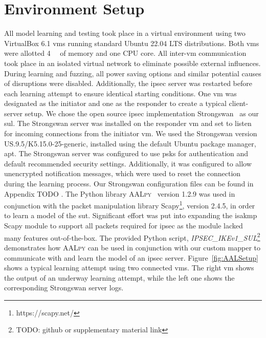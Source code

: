 \section{Environment Setup} \label{sec:env}
All model learning and testing took place in a virtual environment using two VirtualBox 6.1 \acp{vm} running standard Ubuntu 22.04 LTS distributions. Both \acp{vm} were allotted \SI{4}{\giga\byte} of memory and one CPU core. All inter-\ac{vm} communication took place in an isolated virtual network to eliminate possible external influences. During learning and fuzzing, all power saving options and similar potential causes of disruptions were disabled. Additionally, the \ac{ipsec} server was restarted before each learning attempt to ensure identical starting conditions. One \ac{vm} was designated as the initiator and one as the responder to create a typical client-server setup. We chose the open source \ac{ipsec} implementation Strongswan~\cite{software:strongswan} as our \ac{sul}. The Strongswan server was installed on the responder \ac{vm} and set to listen for incoming connections from the initiator \ac{vm}. We used the Strongswan version US.9.5/K5.15.0-25-generic, installed using the default Ubuntu package manager, apt. The Strongswan server was configured to use \acp{psk} for authentication and default recommended security settings. Additionally, it was configured to allow unencrypted notification messages, which were used to reset the connection during the learning process. Our Strongswan configuration files can be found in Appendix TODO . The Python library \textsc{AALpy}~\cite{software:aalpy} version 1.2.9 was used in conjunction with the packet manipulation library Scapy\footnote{https://scapy.net/}, version 2.4.5, in order to learn a model of the \ac{sut}. Significant effort was put into expanding the \ac{isakmp} Scapy module to support all packets required for \ac{ipsec} as the module lacked many features out-of-the-box. The provided Python script, \emph{IPSEC\_IKEv1\_SUL}\footnote{TODO: github or supplementary material link} demonstrates how \textsc{AALpy} can be used in conjunction with our custom mapper to communicate with and learn the model of an \ac{ipsec} server. Figure~\ref{fig:AALSetup} shows a typical learning attempt using two connected \acp{vm}. The right \ac{vm} shows the output of an underway learning attempt, while the left one shows the corresponding Strongswan server logs.

